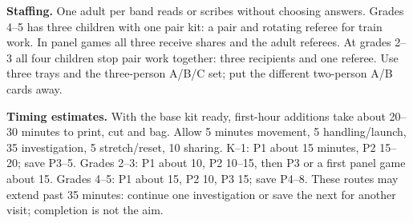 \documentclass[11pt]{article}
\begin{document}
\textbf{Staffing.} One adult per band reads or scribes without choosing answers. Grades 4--5 has three children with one pair kit: a pair and rotating referee for train work. In panel games all three receive shares and the adult referees. At grades 2--3 all four children stop pair work together: three recipients and one referee. Use three trays and the three-person A/B/C set; put the different two-person A/B cards away.

\textbf{Timing estimates.} With the base kit ready, first-hour additions take about 20--30 minutes to print, cut and bag. Allow 5 minutes movement, 5 handling/launch, 35 investigation, 5 stretch/reset, 10 sharing. K--1: P1 about 15 minutes, P2 15--20; save P3--5. Grades 2--3: P1 about 10, P2 10--15, then P3 or a first panel game about 15. Grades 4--5: P1 about 15, P2 10, P3 15; save P4--8. These routes may extend past 35 minutes: continue one investigation or save the next for another visit; completion is not the aim.
\end{document}
